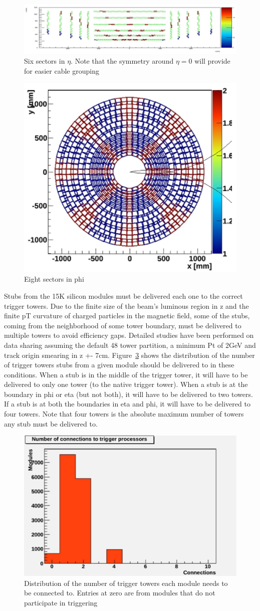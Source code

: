 \begin{figure}[ht!]
\centering
\includegraphics[width=0.8\columnwidth]{Plots/SecDef_RZ.eps}
\caption{Six sectors in $\eta$. Note that the symmetry around $\eta=0$ will provide for easier cable grouping}
\label{fig:SecDef_RZ}
\end{figure}
\begin{figure}[ht!]
\centering
\includegraphics[width=0.4\columnwidth]{Plots/SecDef_XY.eps}
\caption{Eight sectors in phi}
\label{fig:SecDef_XY}
\end{figure}

\noindent Stubs from the 15K silicon modules must be delivered each one to the correct trigger towers. Due to the finite size of the beam's luminous region in z and the finite pT curvature of charged particles in the magnetic field, some of the stubs, coming from the neighborhood of some tower boundary, must be delivered to multiple towers to avoid efficiency gaps.  Detailed studies have been performed on data sharing assuming the default 48 tower partition, a minimum Pt of 2GeV and track origin smearing in z +- 7cm. Figure~\ref{fig:SecDef_N} shows the distribution of the number of trigger towers stubs from a given module should be delivered to in these conditions. When a stub is in the middle of the trigger tower, it will have to be delivered to only one tower (to the native trigger tower). When a stub is at the boundary in phi or eta (but not both), it will have to be delivered to two towers. If a stub is at both the boundaries in eta and phi, it will have to be delivered to four towers. Note that four towers is the absolute maximum number of towers any stub must be delivered to. 

\begin{figure}[ht!]
\centering
\includegraphics[width=0.45\columnwidth]{Plots/SecDef_N.eps}
\caption{Distribution of the number of trigger towers each module needs to be connected to. Entries at zero are from modules that do not participate in triggering}
\label{fig:SecDef_N}
\end{figure}

